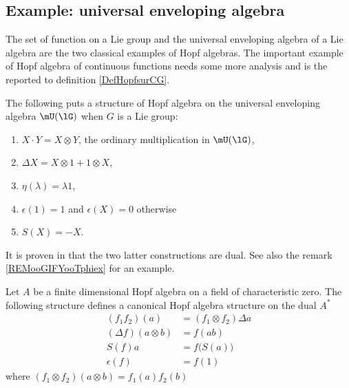 \subsection{Example: universal enveloping algebra}
\label{SUBSECooTKZAooWVXXug}
The set of function on a Lie group and the universal enveloping algebra of a Lie algebra are the two classical examples of Hopf algebras.  The important example of Hopf algebra of continuous functions needs some more analysis and is the reported to definition \ref{DefHopfsurCG}.

The following puts a structure of Hopf algebra on the universal enveloping algebra $\mU(\lG)$ when $G$ is a Lie group:
\begin{enumerate}

	\item
		$X\cdot Y=X\otimes Y$, the ordinary multiplication in $\mU(\lG)$,
	\item
		$\Delta X=X\otimes 1+1\otimes X$,
	\item
		$\eta(\lambda)=\lambda 1$,
	\item	\label{ItemCounitUg}
		$\epsilon(1)=1$ and $\epsilon(X)=0$ otherwise
	\item
		$S(X)=-X$.
\end{enumerate}

It is proven in \cite{Tjin} that the two latter constructions are dual.  See also the remark \ref{REMooGIFYooTphiex} for an example.


\begin{proposition}     \label{PropHopfSurDual}
    Let \( A\) be a finite dimensional Hopf algebra on a field of characteristic zero. The following structure defines a canonical Hopf algebra structure on the dual \( A^*\)
    \begin{subequations}
        \begin{align}
            (f_1f_2)(a)&=(f_1\otimes f_2)\Delta a\\
            (\Delta f)(a\otimes b)&=f(ab)       \label{DefHopfSurAstar}\\
            S(f)a&=f\big( S(a) \big)\\
            \epsilon(f)&=f(1)
        \end{align}
    \end{subequations}
    where \( (f_1\otimes f_2)(a\otimes b)=f_1(a)f_2(b)\) 
\end{proposition}

